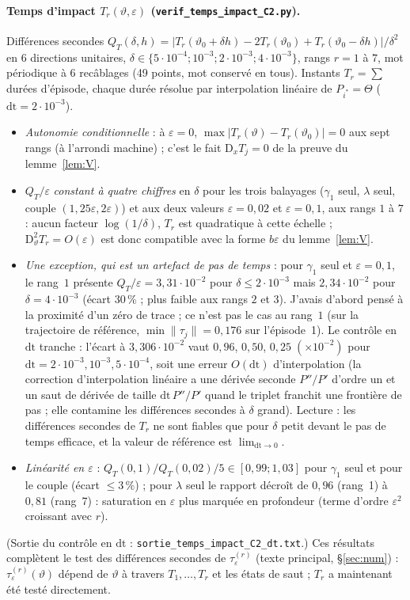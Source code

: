 \documentclass[11pt,a4paper]{article}
\theoremstyle{remark}
\theoremstyle{definition}
\newcommand{\norm}[1]{\lVert #1\rVert}
\newcommand{\eps}{\varepsilon}
\newcommand{\vth}{\vartheta}
\newcommand{\D}{\mathrm D}
\begin{document}
\paragraph{Temps d'impact $T_r(\vth,\eps)$ (\texttt{verif\_temps\_impact\_C2.py}).} Différences secondes $Q_T(\delta,h)=\lvert T_r(\vth_0+\delta h)-2T_r(\vth_0)+T_r(\vth_0-\delta h)\rvert/\delta^2$ en 6 directions unitaires, $\delta\in\{5\cdot10^{-4};10^{-3};2\cdot10^{-3};4\cdot10^{-3}\}$, rangs $r=1$ à $7$, mot périodique à 6 recâblages (49 points, mot conservé en tous). Instants $T_r=\sum$ durées d'épisode, chaque durée résolue par interpolation linéaire de $P_{i^*}=\Theta$ ($\mathrm{dt}=2\cdot10^{-3}$).
\begin{itemize}[nosep]
\item \emph{Autonomie conditionnelle} : à $\eps=0$, $\max\lvert T_r(\vth)-T_r(\vth_0)\rvert=0$ aux sept rangs (à l'arrondi machine) ; c'est le fait $\D_xT_j=0$ de la preuve du lemme~\ref{lem:V}.
\item $Q_T/\eps$ \emph{constant à quatre chiffres} en $\delta$ pour les trois balayages ($\gamma_1$ seul, $\lambda$ seul, couple $(1{,}25\eps,2\eps)$) et aux deux valeurs $\eps=0{,}02$ et $\eps=0{,}1$, aux rangs $1$ à $7$ : aucun facteur $\log(1/\delta)$, $T_r$ est quadratique à cette échelle ; $\D^2_\vth T_r=O(\eps)$ est donc compatible avec la forme $b\eps$ du lemme~\ref{lem:V}.
\item \emph{Une exception, qui est un artefact de pas de temps} : pour $\gamma_1$ seul et $\eps=0{,}1$, le rang~$1$ présente $Q_T/\eps=3{,}31\cdot10^{-2}$ pour $\delta\le2\cdot10^{-3}$ mais $2{,}34\cdot10^{-2}$ pour $\delta=4\cdot10^{-3}$ (écart $30\,\%$ ; plus faible aux rangs $2$ et $3$). J'avais d'abord pensé à la proximité d'un zéro de trace ; ce n'est pas le cas au rang~$1$ (sur la trajectoire de référence, $\min\norm{\tau_j}=0{,}176$ sur l'épisode~1). Le contrôle en $\mathrm{dt}$ tranche : l'écart à $3{,}306\cdot10^{-2}$ vaut $0{,}96$, $0{,}50$, $0{,}25\;(\times10^{-2})$ pour $\mathrm{dt}=2\cdot10^{-3},10^{-3},5\cdot10^{-4}$, soit une erreur $O(\mathrm{dt})$ d'interpolation (la correction d'interpolation linéaire a une dérivée seconde $P''/P'$ d'ordre un et un saut de dérivée de taille $\mathrm{dt}\,P''/P'$ quand le triplet franchit une frontière de pas ; elle contamine les différences secondes à $\delta$ grand). Lecture : les différences secondes de $T_r$ ne sont fiables que pour $\delta$ petit devant le pas de temps efficace, et la valeur de référence est $\lim_{\mathrm{dt}\to0}$.
\item \emph{Linéarité en $\eps$} : $Q_T(0{,}1)/Q_T(0{,}02)/5\in[0{,}99;1{,}03]$ pour $\gamma_1$ seul et pour le couple (écart $\le3\,\%$) ; pour $\lambda$ seul le rapport décroît de $0{,}96$ (rang~1) à $0{,}81$ (rang~7) : saturation en $\eps$ plus marquée en profondeur (terme d'ordre $\eps^2$ croissant avec $r$).
\end{itemize}
(Sortie du contrôle en $\mathrm{dt}$ : \texttt{sortie\_temps\_impact\_C2\_dt.txt}.) Ces résultats complètent le test des différences secondes de $\tau^{(r)}_\eps$ (texte principal, \S\ref{sec:num}) : $\tau^{(r)}_\eps(\vth)$ dépend de $\vth$ à travers $T_1,\dots,T_r$ et les états de saut ; $T_r$ a maintenant été testé directement.
\end{document}
